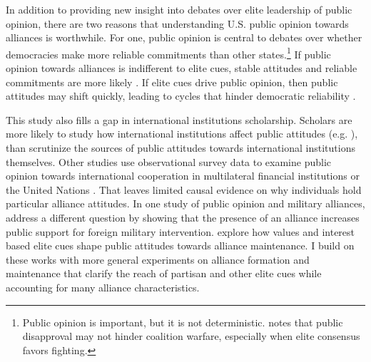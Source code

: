 \documentclass[12pt]{article}
\begin{document}
In addition to providing new insight into debates over elite leadership of public opinion, there are two reasons that understanding U.S. public opinion towards alliances is worthwhile. 
For one, public opinion is central to debates over whether democracies make more reliable commitments than other states.\footnote{Public opinion is important, but it is not deterministic. \citet{Kreps2010} notes that public disapproval may not hinder coalition warfare, especially when elite consensus favors fighting.} 
If public opinion towards alliances is indifferent to elite cues, stable attitudes and reliable commitments are more likely \citep{Gaubatz1996}.
If elite cues drive public opinion, then public attitudes may shift quickly, leading to cycles that hinder democratic reliability \citep{GartzkeGleditsch2004}.




This study also fills a gap in international institutions scholarship. 
Scholars are more likely to study how international institutions affect public attitudes (e.g. \citep{KayaWalker2014, Greenhill2020}), than scrutinize the sources of public attitudes towards international institutions themselves. 
Other studies use observational survey data to examine public opinion towards international cooperation in multilateral financial institutions \citep{Edwards2009} or the United Nations \citep{Torgler2008, DellmuthTallberg2015}. 
That leaves limited causal evidence on why individuals hold particular alliance attitudes.
In one study of public opinion and military alliances, \citet{TomzWeeks2021} address a different question by showing that the presence of an alliance increases public support for foreign military intervention. 
\citet{Chuetal2021} explore how values and interest based elite cues shape public attitudes towards alliance maintenance. 
I build on these works with more general experiments on alliance formation and maintenance that clarify the reach of partisan and other elite cues while accounting for many alliance characteristics. 
\end{document}
